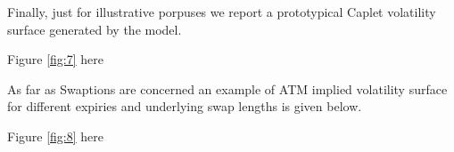 Finally, just for illustrative porpuses we report a prototypical Caplet volatility surface generated by the model.
\begin{center}
Figure \eqref{fig:7}  here
\end{center}
As far as Swaptions are concerned an example of ATM implied volatility surface for different expiries and underlying swap lengths is given below.
\begin{center}
Figure \eqref{fig:8}  here
\end{center}

